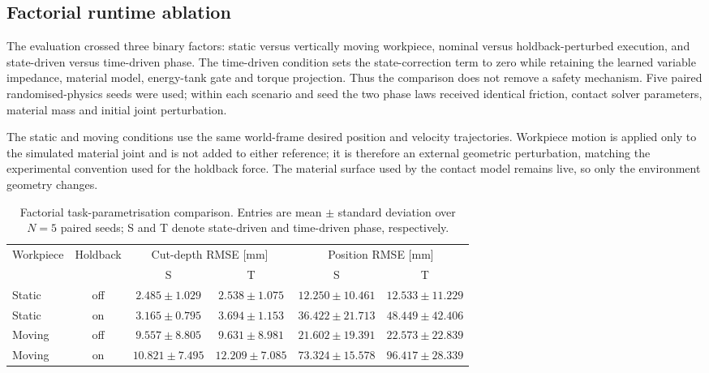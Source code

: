 \documentclass[11pt,a4paper]{article}
\begin{document}
\subsection{Factorial runtime ablation}
The evaluation crossed three binary factors: static versus vertically moving
workpiece, nominal versus holdback-perturbed execution, and state-driven versus
time-driven phase.  The time-driven condition sets the state-correction term to
zero while retaining the learned variable impedance, material model,
energy-tank gate and torque projection.  Thus the comparison does not remove a
safety mechanism.  Five paired randomised-physics seeds were used; within each
scenario and seed the two phase laws received identical friction, contact
solver parameters, material mass and initial joint perturbation.

The static and moving conditions use the same world-frame desired position and
velocity trajectories. Workpiece motion is applied only to the simulated
material joint and is not added to either reference; it is therefore an
external geometric perturbation, matching the experimental convention used
for the holdback force. The material surface used by the contact model remains
live, so only the environment geometry changes.

\begin{table}[h]
\centering
\small
\caption{Factorial task-parametrisation comparison. Entries are mean
$\pm$ standard deviation over $N=5$ paired seeds; S and T denote state-driven
and time-driven phase, respectively.}
\label{tab:phase_factorial}
\begin{tabular}{lccccc}
\toprule
Workpiece & Holdback &
\multicolumn{2}{c}{Cut-depth RMSE [mm]} &
\multicolumn{2}{c}{Position RMSE [mm]} \\
& & S & T & S & T \\
\midrule
Static & off & $2.485\pm1.029$ & $2.538\pm1.075$
             & $12.250\pm10.461$ & $12.533\pm11.229$ \\
Static & on  & $3.165\pm0.795$ & $3.694\pm1.153$
             & $36.422\pm21.713$ & $48.449\pm42.406$ \\
Moving & off & $9.557\pm8.805$ & $9.631\pm8.981$
             & $21.602\pm19.391$ & $22.573\pm22.839$ \\
Moving & on  & $10.821\pm7.495$ & $12.209\pm7.085$
             & $73.324\pm15.578$ & $96.417\pm28.339$ \\
\bottomrule
\end{tabular}
\end{table}
\end{document}

